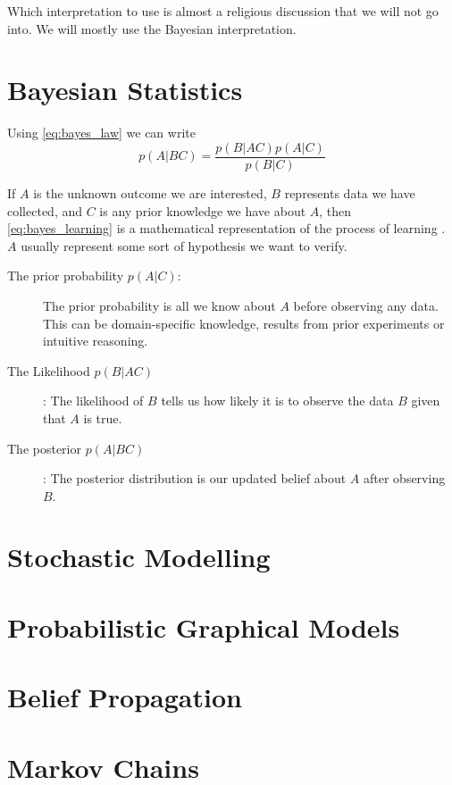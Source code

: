 Which interpretation to use is almost a religious discussion that we will not go into. We will mostly use the Bayesian interpretation.





\section{Bayesian Statistics}

Using \cref{eq:bayes_law} we can write 
\begin{equation}\label{eq:bayes_learning}
    p(A|BC) = \frac{p(B | AC) p(A | C)}{p(B | C)}
\end{equation}

If $A$ is the unknown outcome we are interested, $B$ represents data we have collected, and $C$ is any prior knowledge we have about $A$, then \cref{eq:bayes_learning} is a mathematical representation of the process of learning \cite{Jaynes86bayesianmethods:}. $A$ usually represent some sort of hypothesis we want to verify. 

\begin{description}
    \item[The prior probability $p(A | C)$:] The prior probability is all we know about $A$ before observing any data. This can be domain-specific knowledge, results from prior experiments or intuitive reasoning. 
    \item[The Likelihood $p(B | AC)$]: The likelihood of $B$ tells us how likely it is to observe the data $B$ given that $A$ is true. 
    \item[The posterior $p(A | BC)$]: The posterior distribution is our updated belief about $A$ after observing $B$.    
\end{description}

\section{Stochastic Modelling}

\section{Probabilistic Graphical Models}

\section{Belief Propagation}

\section{Markov Chains}

